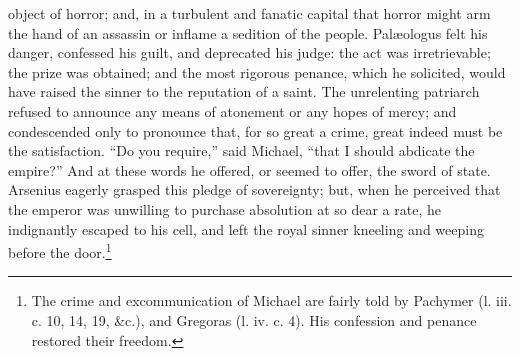 object of horror; and, in a turbulent and fanatic capital that horror might arm the hand of an assassin or inflame a sedition of the people. Palæologus felt his danger, confessed his guilt, and deprecated his judge: the act was irretrievable; the prize was obtained; and the most rigorous penance, which he solicited, would have raised the sinner to the reputation of a saint. The unrelenting patriarch refused to announce any means of atonement or any hopes of mercy; and condescended only to pronounce that, for so great a crime, great indeed must be the satisfaction. \texthebrew{“}Do you require,\texthebrew{}” said Michael, \texthebrew{“}that I should abdicate the empire?\texthebrew{}” And at these words he offered, or seemed to offer, the sword of state. Arsenius eagerly grasped this pledge of sovereignty; but, when he perceived that the emperor was unwilling to purchase absolution at so dear a rate, he indignantly escaped to his cell, and left the royal sinner kneeling and weeping before the door.\footnote{The crime and excommunication of Michael are fairly told by Pachymer (l. iii. c. 10, 14, 19, \&c.), and Gregoras (l. iv. c. 4). His confession and penance restored their freedom.}


